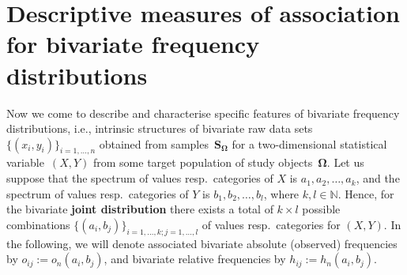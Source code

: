 \chapter[Measures of association for bivariate
distributions]{Descriptive measures of association for bivariate
frequency distributions}
Now we come to describe and characterise specific features of 
bivariate frequency distributions, i.e., intrinsic structures of 
bivariate raw data sets $\{(x_{i},y_{i})\}_{i=1,\ldots,n}$ 
obtained from samples~$\boldsymbol{S_{\Omega}}$ for a 
two-dimensional statistical variable~$(X,Y)$ from some target 
population of study objects~$\boldsymbol{\Omega}$. Let us suppose 
that the spectrum of values resp.\ categories of $X$ is $a_{1}, 
a_{2}, \ldots, a_{k}$, and the spectrum of values resp.\ 
categories of $Y$ is $b_{1}, b_{2}, \ldots, b_{l}$, where $k, l 
\in \mathbb{N}$. Hence, for the bivariate \textbf{joint
distribution} there exists a total of $k \times l$ possible
combinations $\{(a_{i},b_{j})\}_{i=1,\ldots,k;j=1,\ldots,l}$ of
values resp.\ categories for $(X,Y)$. In the following, we will
denote associated bivariate absolute (observed) frequencies by 
$o_{ij}:=o_{n}(a_{i},b_{j})$, and bivariate relative frequencies 
by $h_{ij}:=h_{n}(a_{i},b_{j})$.

